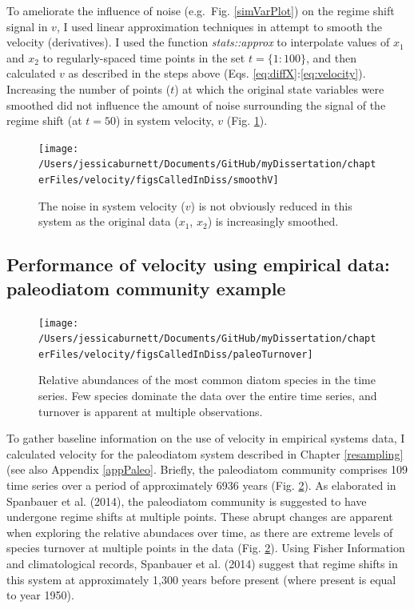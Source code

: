 \documentclass[12pt,twoside,openany]{reedthesis}
\begin{document}
To ameliorate the influence of noise (e.g.~Fig. \ref{simVarPlot}) on the regime shift signal in \(v\), I used linear approximation techniques in attempt to smooth the velocity (derivatives). I used the function \emph{stats::approx} to interpolate values of \(x_1\) and \(x_2\) to regularly-spaced time points in the set \(t=\{1:100\}\), and then calculated \(v\) as described in the steps above (Eqs. \eqref{eq:diffX}:\eqref{eq:velocity}). Increasing the number of points (\(t\)) at which the original state variables were smoothed did not influence the amount of noise surrounding the signal of the regime shift (at \(t=50\)) in system velocity, \(v\) (Fig. \ref{fig:smoothV}).
\begin{figure}
\texttt{[image: /Users/jessicaburnett/Documents/GitHub/myDissertation/chapterFiles/velocity/figsCalledInDiss/smoothV]} \caption{The noise in system velocity ($v$) is not obviously reduced in this system as the original data ($x_1$, $x_2$) is increasingly smoothed.}\label{fig:smoothV}
\end{figure}
\hypertarget{performance-of-velocity-using-empirical-data-paleodiatom-community-example}{%
\subsection{Performance of velocity using empirical data: paleodiatom community example}\label{performance-of-velocity-using-empirical-data-paleodiatom-community-example}}
\begin{figure}
\texttt{[image: /Users/jessicaburnett/Documents/GitHub/myDissertation/chapterFiles/velocity/figsCalledInDiss/paleoTurnover]} \caption{Relative abundances of the most common diatom species in the time series. Few species dominate the data over the entire time series, and turnover is apparent at multiple observations.}\label{fig:paleoTurnover}
\end{figure}
To gather baseline information on the use of velocity in empirical systems data, I calculated velocity for the paleodiatom system described in Chapter \ref{resampling} (see also Appendix \ref{appPaleo}. Briefly, the paleodiatom community comprises 109 time series over a period of approximately 6936 years (Fig. \ref{fig:paleoTurnover}). As elaborated in Spanbauer et al. (2014), the paleodiatom community is suggested to have undergone regime shifts at multiple points. These abrupt changes are apparent when exploring the relative abundaces over time, as there are extreme levels of species turnover at multiple points in the data (Fig. \ref{fig:paleoTurnover}). Using Fisher Information and climatological records, Spanbauer et al. (2014) suggest that regime shifts in this system at approximately 1,300 years before present (where present is equal to year 1950).
\end{document}
